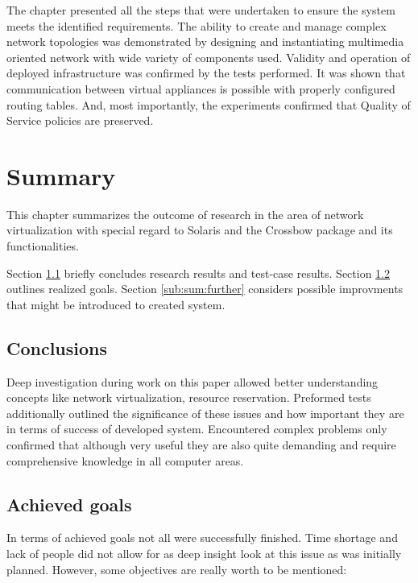 \documentclass[11pt]{book}
\begin{document}
      The chapter presented all the steps that were undertaken to ensure the system meets the identified requirements.
      The ability to create and manage complex network topologies was demonstrated by designing and instantiating
      multimedia oriented network with wide variety of components used. Validity and operation of deployed
      infrastructure was confirmed by the tests performed. It was shown that communication between virtual appliances is
      possible with properly configured routing tables. And, most importantly, the experiments confirmed that Quality of
      Service policies are preserved.


  \chapter{Summary}
  \label{chap:sum}

	  This chapter summarizes the outcome of research in the area of network virtualization with special regard to 
	  Solaris and the Crossbow package and its functionalities. 
	  
	  Section \ref{sub:sum:concl} briefly concludes research results and test-case results.
	  Section \ref{sub:sum:achieved} outlines realized goals.
	  Section \ref{sub:sum:further} considers possible improvments that might be introduced to created system.

    \section{Conclusions}
		\label{sub:sum:concl}
		
		Deep investigation during work on this paper allowed better understanding concepts like network virtualization,
		resource reservation. Preformed tests additionally outlined the significance of these issues and how important they
		are in terms of success of developed system. Encountered complex problems only confirmed that although very useful 
		they are also quite demanding and require comprehensive knowledge in all computer areas.
		
    \section{Achieved goals}
		\label{sub:sum:achieved}
		
		In terms of achieved goals not all were successfully finished. Time shortage and lack of people did not allow 
		for as deep insight look at this issue as was initially planned. However, some objectives are really worth to
		be mentioned:
	  
\end{document}
